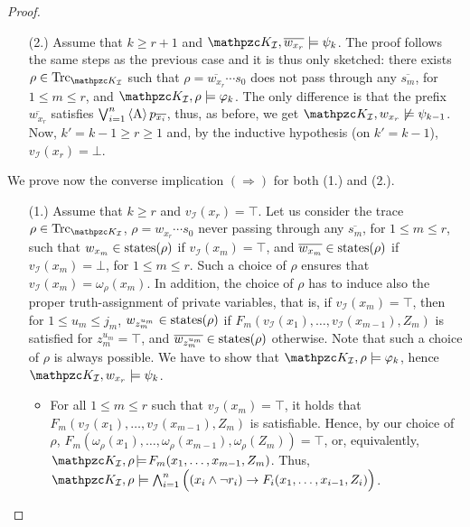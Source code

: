 \begin{proof}
\begin{itemize}
\item[(2.)] Assume that $k\geq r+1$ and $\Ku_\mathcal{I},\overline{w_{x_r}}\models \psi_k$. The proof follows the same steps as the previous case and it is thus only sketched: there exists $\rho\in\Trk_{\Ku_\mathcal{I}}$ such that $\rho=\overline{w_{x_r}}\cdots s_0$ does not pass through any $\overline{s_m}$, for $1\leq m\leq r$, and $\Ku_\mathcal{I},\rho\models \varphi_k$. The only difference is that the prefix $\overline{w_{x_r}}$ satisfies $\bigvee_{i=1}^n \operatorname{\langle A\rangle} p_{\overline{x_i}}$, thus, as before, we get $\Ku_\mathcal{I}, w_{x_r}\not\models \psi_{k-1}$. Now, $k'=k-1\geq r\geq 1$ and, by the inductive hypothesis (on $k'=k-1$),  $v_\mathcal{I}(x_r)=\bot$.
\end{itemize}

We prove now the converse implication $(\Rightarrow)$ for both (1.) and (2.).
\begin{itemize}
\item[(1.)] Assume that $k\geq r$ and $v_\mathcal{I}(x_r)=\top$. Let us consider the trace $\rho\in\Trk_{\Ku_\mathcal{I}}$, $\rho=w_{x_r}\cdots s_0$ never passing through any $\overline{s_m}$, for $1\leq m\leq r$, such that $w_{x_m}\in\operatorname{states}(\rho)$ if $v_\mathcal{I}(x_m)=\top$, and $\overline{w_{x_m}}\in\operatorname{states}(\rho)$ if $v_\mathcal{I}(x_m)=\bot$, for $1\leq m\leq r$. Such a choice of 
$\rho$ ensures that $v_\mathcal{I}(x_m)=\omega_\rho(x_m)$. In addition, the choice of $\rho$ has to induce also the proper truth-assignment of private variables,
that is, if $v_\mathcal{I}(x_m)=\top$, then for $1\leq u_m\leq j_m$, $w_{z_m^{u_m}}\in\operatorname{states}(\rho)$ if $F_m(v_\mathcal{I}(x_1),\ldots , v_\mathcal{I}(x_{m-1}),Z_m)$ is satisfied for $z_m^{u_m}= \top$, and $\overline{w_{z_m^{u_m}}}\in\operatorname{states}(\rho)$ otherwise. Note that such a choice of $\rho$ is always possible.
We have to show that $\Ku_\mathcal{I},\rho\models \varphi_k$, hence $\Ku_\mathcal{I},w_{x_r}\models \psi_k$.
\begin{itemize}
	\item For all $1\leq m\leq r$ such that $v_\mathcal{I}(x_m)=\top$, it holds that $F_m(v_\mathcal{I}(x_1),\ldots ,\allowbreak v_\mathcal{I}(x_{m-1}), Z_m)$ is satisfiable. Hence, by our choice of $\rho$, $F_m(\omega_\rho(x_1),\ldots ,\allowbreak \omega_\rho(x_{m-1}),\omega_\rho(Z_m))\!=\!\top$, or, equivalently, $\Ku_\mathcal{I},\rho\!\models\! F_m(x_1, \ldots, x_{m-1}, Z_m)$. Thus, $\Ku_\mathcal{I},\rho\models \bigwedge_{i=1}^n \Big((x_i\wedge \neg r_i)\rightarrow F_i(x_1, \ldots, x_{i-1}, Z_i)\Big)$. 


\end{itemize}
\end{itemize}
\end{proof}
